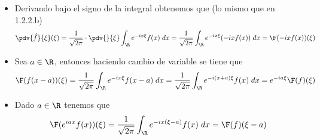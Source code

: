 \documentclass{article}
\begin{document}
\begin{enumerate}
\begin{itemize}
        \item Derivando bajo el signo de la integral obtenemos que (lo mismo que en 1.2.2.b)
        \begin{equation*}
            \pdv{\hat{f}}{\xi}(\xi)
            =\frac{1}{\sqrt{2\pi}}\cdot\pdv{}{\xi}\int_{\R}e^{-ix\xi}f(x)\hspace{1mm}dx
            =\frac{1}{\sqrt{2\pi}}\int_{\R}e^{-ix\xi}(-ixf(x))\hspace{1mm}dx=\F(-ixf(x))(\xi)
        \end{equation*}

        \item Sea $a\in\R$, entonces haciendo cambio de variable se tiene que
        \begin{equation*}
            \F(f(x-a))(\xi)=\frac{1}{\sqrt{2\pi}}\int_{\R}e^{-ix\xi}f(x-a)\hspace{1mm}dx
            =\frac{1}{\sqrt{2\pi}}\int_{\R}e^{-i(x+a)\xi}f(x)\hspace{1mm}dx
            =e^{-ia\xi}\F(f)(\xi)
        \end{equation*}

        \item Dado $a\in\R$ tenemos que
        \begin{equation*}
            \F(e^{iax}f(x))(\xi)=\frac{1}{\sqrt{2\pi}}\int_{\R}e^{-ix(\xi-a)}f(x)\hspace{1mm}dx
            =\F(f)(\xi-a)
        \end{equation*}
    \end{itemize}
\end{enumerate}
\end{document}
